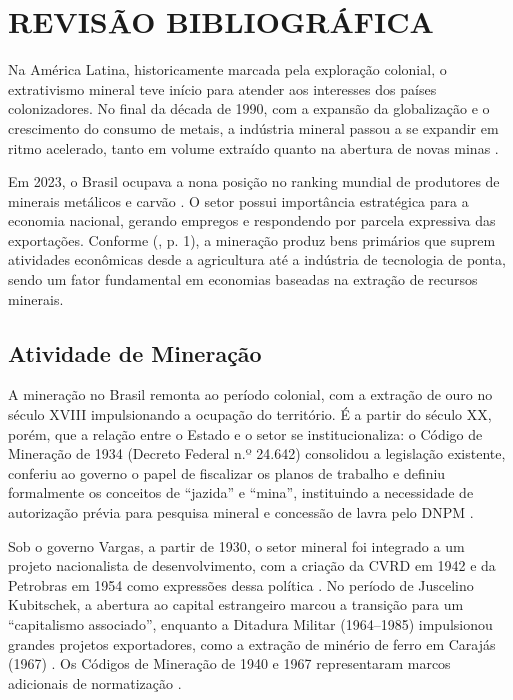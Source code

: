 \chapter{REVISÃO BIBLIOGRÁFICA}
\label{cap1Revisao}

Na América Latina, historicamente marcada pela exploração colonial, o extrativismo mineral teve início para atender aos interesses dos países colonizadores. No final da década de 1990, com a expansão da globalização e o crescimento do consumo de metais, a indústria mineral passou a se expandir em ritmo acelerado, tanto em volume extraído quanto na abertura de novas minas \cite{fernandes2016mineracao}.

Em 2023, o Brasil ocupava a nona posição no ranking mundial de produtores de minerais metálicos e carvão \cite{wpr2024mineral}. O setor possui importância estratégica para a economia nacional, gerando empregos e respondendo por parcela expressiva das exportações. Conforme \citeauthor{carvalho2012dependencia} (\citeyear{carvalho2012dependencia}, p. 1), a mineração produz bens primários que suprem atividades econômicas desde a agricultura até a indústria de tecnologia de ponta, sendo um fator fundamental em economias baseadas na extração de recursos minerais.

\section{Atividade de Mineração}
\label{sec:atividade_mineracao}

A mineração no Brasil remonta ao período colonial, com a extração de ouro no século XVIII impulsionando a ocupação do território. É a partir do século XX, porém, que a relação entre o Estado e o setor se institucionaliza: o Código de Mineração de 1934 (Decreto Federal n.º 24.642) consolidou a legislação existente, conferiu ao governo o papel de fiscalizar os planos de trabalho e definiu formalmente os conceitos de ``jazida'' e ``mina'', instituindo a necessidade de autorização prévia para pesquisa mineral e concessão de lavra pelo DNPM \cite{brasil1934b, domingues2022}.

Sob o governo Vargas, a partir de 1930, o setor mineral foi integrado a um projeto nacionalista de desenvolvimento, com a criação da CVRD em 1942 e da Petrobras em 1954 como expressões dessa política \cite{villasboas1995, fonseca2012}. No período de Juscelino Kubitschek, a abertura ao capital estrangeiro marcou a transição para um ``capitalismo associado'', enquanto a Ditadura Militar (1964--1985) impulsionou grandes projetos exportadores, como a extração de minério de ferro em Carajás (1967) \cite{fernandes2016, domingues2022}. Os Códigos de Mineração de 1940 e 1967 representaram marcos adicionais de normatização \cite{brasil1967, domingues2022}.

